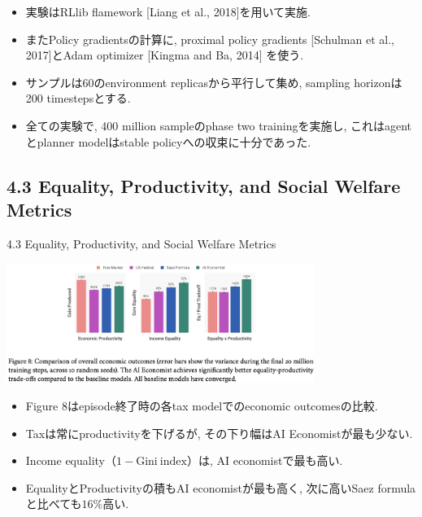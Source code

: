 \documentclass[unicode,aspectratio=169,11pt]{beamer}
\begin{document}
\begin{frame}{}{}
\begin{itemize}
    \item 実験はRLlib flamework [Liang et al., 2018]を用いて実施.
    \item またPolicy gradientsの計算に, proximal policy gradients [Schulman et al., 2017]とAdam optimizer [Kingma and Ba, 2014] を使う.
    \item サンプルは60のenvironment replicasから平行して集め, sampling horizonは200 timestepsとする.
    \item 全ての実験で, 400 million sampleのphase two trainingを実施し, これはagentとplanner modelはstable policyへの収束に十分であった.
\end{itemize}
\end{frame}

\subsection{4.3 Equality, Productivity, and Social Welfare Metrics}
\begin{frame}{4.3 Equality, Productivity, and Social Welfare Metrics}{}
    \begin{center}
        \includegraphics[width=10cm]{figure8.png}
    \end{center}
    \begin{itemize}
        \item Figure 8はepisode終了時の各tax modelでのeconomic outcomesの比較.
        \item Taxは常にproductivityを下げるが, その下り幅はAI Economistが最も少ない.
        \item Income equality（$1 - \mathrm{Gini\ index}$）は, AI economistで最も高い.
        \item EqualityとProductivityの積もAI economistが最も高く, 次に高いSaez formulaと比べても$16\%$高い.
    \end{itemize}
\end{frame}
\end{document}
